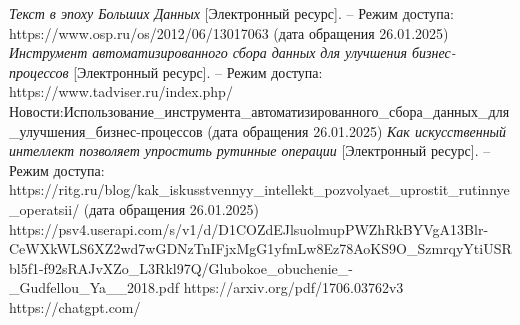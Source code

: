\begin{thebibliography}{}
	\textit{Текст в эпоху Больших Данных} [Электронный ресурс]. --
	Режим доступа: https://www.osp.ru/os/2012/06/13017063 (дата обращения 26.01.2025)
	\textit{Инструмент автоматизированного сбора данных для улучшения бизнес-процессов} [Электронный ресурс]. --
	Режим доступа: https://www.tadviser.ru/index.php/Новости:Использование\_инструмента\_автоматизированного\_сбора\_данных\_для\_улучшения\_бизнес-процессов (дата обращения 26.01.2025)
	\textit{Как искусственный интеллект позволяет упростить рутинные операции} [Электронный ресурс]. --
	Режим доступа: https://ritg.ru/blog/kak\_iskusstvennyy\_intellekt\_pozvolyaet\_uprostit\_rutinnye\_operatsii/ (дата обращения 26.01.2025)
	https://psv4.userapi.com/s/v1/d/D1COZdEJlsuolmupPWZhRkBYVgA13Blr-CeWXkWLS6XZ2wd7wGDNzTnIFjxMgG1yfmLw8Ez78AoKS9O_SzmrqyYtiUSRbl5f1-f92sRAJvXZo_L3Rkl97Q/Glubokoe_obuchenie_-_Gudfellou_Ya__2018.pdf
	https://arxiv.org/pdf/1706.03762v3
	https://chatgpt.com/




\end{thebibliography}